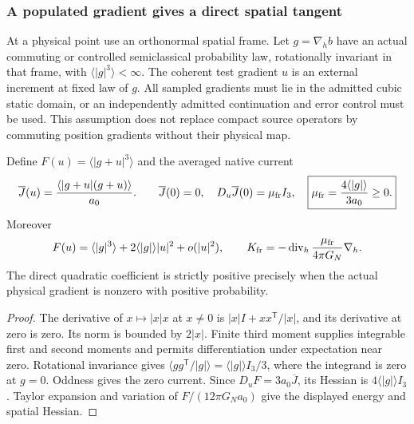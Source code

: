 \documentclass[12pt,a4paper]{article}
\begin{document}
\subsubsection{A populated gradient gives a direct spatial tangent}
At a physical point use an orthonormal spatial frame. Let $g=\nabla_h b$
have an actual commuting or controlled semiclassical probability law,
rotationally invariant in that frame, with $\langle |g|^3\rangle<\infty$.
The coherent test gradient $u$ is an external increment at fixed law of
$g$. All sampled gradients must lie in the admitted cubic static domain,
or an independently admitted continuation and error control must be used.
This assumption does not replace compact source operators by commuting
position gradients without their physical map.

\begin{theorem}
\label{p8:thm:v2209-state-rar-tangent}
Define $F(u)=\langle|g+u|^3\rangle$ and the averaged native current
\begin{equation}
\label{p8:eq:v2209-state-rar-tangent}
 \overline J(u)=\frac{\langle |g+u|(g+u)\rangle}{a_0}.
 \qquad
 \overline J(0)=0,\quad D_u\overline J(0)=\mu_{\rm fr}I_3,
 \quad \boxed{\mu_{\rm fr}=\frac{4\langle|g|\rangle}{3a_0}\ge0.}
\end{equation}
Moreover
\begin{equation}
\label{p8:eq:v2209-state-rar-energy-tangent}
 F(u)=\langle|g|^3\rangle+2\langle|g|\rangle|u|^2+o(|u|^2),
 \qquad
 K_{\rm fr}=-\operatorname{div}_h
                   \frac{\mu_{\rm fr}}{4\pi G_N}\nabla_h.
\end{equation}
The direct quadratic coefficient is strictly positive precisely when
the actual physical gradient is nonzero with positive probability.
\end{theorem}
\begin{proof}
The derivative of $x\mapsto|x|x$ at $x\ne0$ is
$|x|I+xx^{\mathsf T}/|x|$, and its derivative at zero is zero.
Its norm is bounded by $2|x|$. Finite third moment supplies integrable
first and second moments and permits differentiation under expectation
near zero. Rotational invariance gives
$\langle gg^{\mathsf T}/|g|\rangle=\langle|g|\rangle I_3/3$,
where the integrand is zero at $g=0$. Oddness gives the zero current.
Since $D_u F=3a_0\overline J$, its Hessian is
$4\langle|g|\rangle I_3$. Taylor expansion and variation of
$F/(12\pi G_Na_0)$ give the displayed energy and spatial Hessian.
\end{proof}
\end{document}
